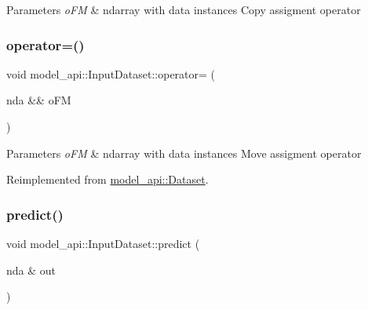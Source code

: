 \begin{DoxyParams}{Parameters}
{\em o\+FM} & ndarray with data instances Copy assigment operator \\
\hline
\end{DoxyParams}
\mbox{\label{classmodel__api_1_1InputDataset_a192c20a95f93e03b4c4adb07e8e5e077}} 
\subsubsection{\texorpdfstring{operator=()}{operator=()}\hspace{0.1cm}{\footnotesize\ttfamily [2/2]}}
{\footnotesize\ttfamily void model\+\_\+api\+::\+Input\+Dataset\+::operator= (\begin{DoxyParamCaption}\item[{nda \&\&}]{o\+FM }\end{DoxyParamCaption})\hspace{0.3cm}{\ttfamily [virtual]}}


\begin{DoxyParams}{Parameters}
{\em o\+FM} & ndarray with data instances Move assigment operator \\
\hline
\end{DoxyParams}


Reimplemented from \hyperlink{classmodel__api_1_1Dataset_a48ed0afad3bae183a4615a4de9dba854}{model\+\_\+api\+::\+Dataset}.

\mbox{\label{classmodel__api_1_1InputDataset_af25824b44f866ff2b03e5d1036d7215a}} 
\subsubsection{\texorpdfstring{predict()}{predict()}}
{\footnotesize\ttfamily void model\+\_\+api\+::\+Input\+Dataset\+::predict (\begin{DoxyParamCaption}\item[{nda \&}]{out }\end{DoxyParamCaption})}


